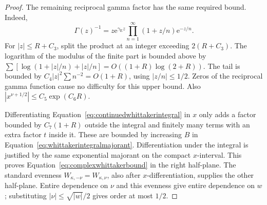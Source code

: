 \documentclass[11pt,letterpaper]{article}
\numberwithin{equation}{section}
\theoremstyle{definition}
\theoremstyle{remark}
\newcommand{\e}{\mathrm e}
\begin{document}
\begin{proof}
The remaining reciprocal gamma factor has the same required bound. Indeed,
\begin{equation}
 \Gamma(z)^{-1}=z\e^{\gamma_{\mathrm E}z}
      \prod_{n=1}^{\infty}(1+z/n)\e^{-z/n}.
 \label{eq:reciprocalgammaproduct}
\end{equation}
For $|z|\leq R+C_3$, split the product at an integer exceeding $2(R+C_3)$. The logarithm of the modulus of the finite part is bounded above by
$\sum[\log(1+|z|/n)+|z|/n]=O((1+R)\log(2+R))$.
The tail is bounded by $C_4|z|^2\sum n^{-2}=O(1+R)$, using $|z/n|\leq1/2$. Zeros of the reciprocal gamma function cause no difficulty for this upper bound. Also $|x^{\nu+1/2}|\leq C_5\exp(C_6R)$.

Differentiating Equation~\eqref{eq:continuedwhittakerintegral} in $x$ only adds a factor bounded by $C_7(1+R)$ outside the integral and finitely many terms with an extra factor $t$ inside it. These are bounded by increasing $B$ in Equation~\eqref{eq:whittakerintegralmajorant}. Differentiation under the integral is justified by the same exponential majorant on the compact $x$-interval. This proves Equation~\eqref{eq:complexwhittakerbound} in the right half-plane. The standard evenness $W_{\kappa,-\nu}=W_{\kappa,\nu}$, also after $x$-differentiation, supplies the other half-plane. Entire dependence on $\nu$ and this evenness give entire dependence on $w$; substituting $|\nu|\leq\sqrt{|w|}/2$ gives order at most $1/2$.
\end{proof}
\end{document}
